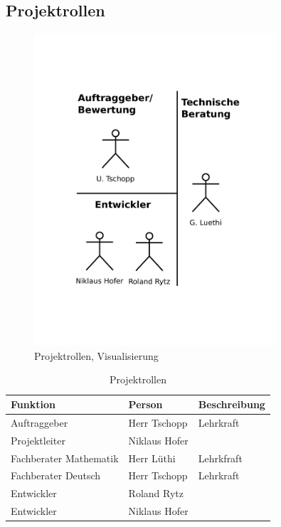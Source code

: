 \documentclass[11pt,paper=a4,final]{scrartcl}
\begin{document}
\subsection{Projektrollen}
\begin{figure}[h!]
  \centering
  \includegraphics[width=0.8\textwidth]{rollen.pdf}
  \caption{Projektrollen, Visualisierung}
  \label{fig:projektrollen}
\end{figure}
\begin{table}[h!]
  \centering
  \begin{tabular}{|l|l|l|}
    \hline
    \bf Funktion & \bf Person & \bf Beschreibung \\ \hline
    Auftraggeber & Herr Tschopp & Lehrkraft \\ \hline
    Projektleiter & Niklaus Hofer & \\ \hline
    Fachberater Mathematik & Herr L\"uthi & Lehrkfraft \\ \hline
    Fachberater Deutsch & Herr Tschopp & Lehrkraft \\ \hline
    Entwickler & Roland Rytz & \\ \hline
    Entwickler & Niklaus Hofer & \\ \hline
  \end{tabular}
  \caption{Projektrollen}
\end{table}
\end{document}
